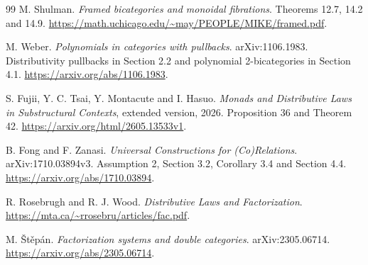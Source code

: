 \documentclass[11pt,a4paper]{article}
\theoremstyle{definition}
\begin{document}
\begin{thebibliography}{99}
M. Shulman. \emph{Framed bicategories and monoidal fibrations}.
Theorems 12.7, 14.2 and 14.9.
\url{https://math.uchicago.edu/~may/PEOPLE/MIKE/framed.pdf}.

M. Weber. \emph{Polynomials in categories with pullbacks}.
arXiv:1106.1983. Distributivity pullbacks in Section 2.2 and polynomial
2-bicategories in Section 4.1.
\url{https://arxiv.org/abs/1106.1983}.

S. Fujii, Y. C. Tsai, Y. Montacute and I. Hasuo.
\emph{Monads and Distributive Laws in Substructural Contexts}, extended
version, 2026. Proposition 36 and Theorem 42.
\url{https://arxiv.org/html/2605.13533v1}.

B. Fong and F. Zanasi. \emph{Universal Constructions for (Co)Relations}.
arXiv:1710.03894v3. Assumption 2, Section 3.2, Corollary 3.4 and Section 4.4.
\url{https://arxiv.org/abs/1710.03894}.

R. Rosebrugh and R. J. Wood. \emph{Distributive Laws and Factorization}.
\url{https://mta.ca/~rrosebru/articles/fac.pdf}.

M. \v{S}t\v{e}p\'an. \emph{Factorization systems and double categories}.
arXiv:2305.06714.
\url{https://arxiv.org/abs/2305.06714}.
\end{thebibliography}
\end{document}
